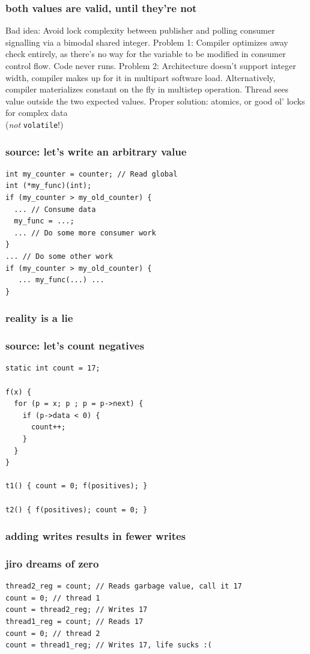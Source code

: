 \documentclass{beamer}
\begin{document}
\begin{frame}
\frametitle{both values are valid, until they're not}
Bad idea: Avoid lock complexity between publisher and polling consumer signalling via a bimodal shared integer.
\vfill
Problem 1: Compiler optimizes away check entirely, as there's no way for the variable to be modified in consumer control flow. Code never runs.
\vfill
Problem 2: Architecture doesn't support integer width, compiler makes up for it in multipart software load. Alternatively, compiler materializes constant on the fly in multistep operation. Thread sees value outside the two expected values.
\vfill
Proper solution: atomics, or good ol' locks for complex data\\
  (\textit{not} \texttt{volatile}!)
\end{frame}

\begin{frame}[fragile]
\frametitle{source: let's write an arbitrary value}
\begin{lstlisting}
int my_counter = counter; // Read global
int (*my_func)(int);
if (my_counter > my_old_counter) {
  ... // Consume data
  my_func = ...;
  ... // Do some more consumer work
}
... // Do some other work
if (my_counter > my_old_counter) {
   ... my_func(...) ...
}
\end{lstlisting}
\end{frame}

\begin{frame}
\frametitle{reality is a lie}
\end{frame}

\begin{frame}[fragile]
\frametitle{source: let's count negatives}
\begin{lstlisting}
static int count = 17;

f(x) {
  for (p = x; p ; p = p->next) {
    if (p->data < 0) {
      count++;
    }
  }
}

t1() { count = 0; f(positives); }

t2() { f(positives); count = 0; }
\end{lstlisting}
\end{frame}

\begin{frame}
\frametitle{adding writes results in fewer writes}
\end{frame}

\begin{frame}[fragile]
\frametitle{jiro dreams of zero}
\begin{lstlisting}
thread2_reg = count; // Reads garbage value, call it 17
count = 0; // thread 1
count = thread2_reg; // Writes 17
thread1_reg = count; // Reads 17
count = 0; // thread 2
count = thread1_reg; // Writes 17, life sucks :(
\end{lstlisting}
\end{frame}
\end{document}
